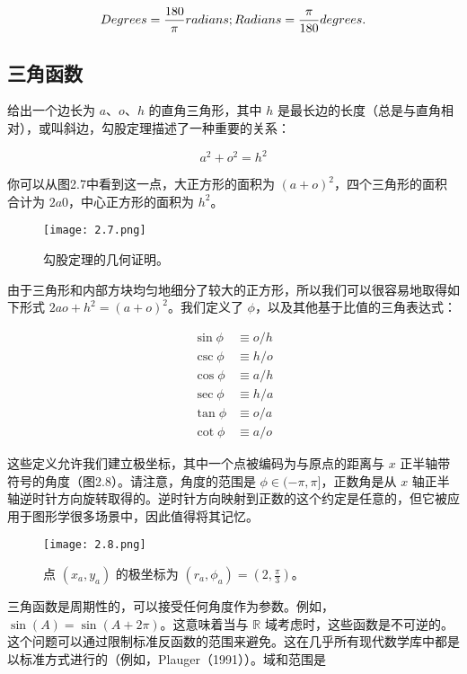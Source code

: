 \documentclass[lang=cn,12pt]{elegantbook}
\begin{document}
$$
Degrees =\frac{180}{\pi} radians; \\
Radians =\frac{\pi}{180} degrees.
$$

\subsection{三角函数}

给出一个边长为 $a$、$o$、$h$ 的直角三角形，其中 $h$ 是最长边的长度（总是与直角相对），或叫斜边，勾股定理描述了一种重要的关系：

$$
a^2+o^2=h^2
$$

你可以从图2.7中看到这一点，大正方形的面积为 $(a+o)^2$，四个三角形的面积合计为 $2a0$，中心正方形的面积为 $h^2$。


\begin{figure}[htbp]
\centering
\texttt{[image: 2.7.png]}
\caption{勾股定理的几何证明。}
\end{figure}

由于三角形和内部方块均匀地细分了较大的正方形，所以我们可以很容易地取得如下形式 $2ao+h^2=(a+o)^2$。我们定义了 $\phi$，以及其他基于比值的三角表达式：

$$
\begin{aligned}
\sin \phi & \equiv o / h \\
\csc \phi & \equiv h / o \\
\cos \phi & \equiv a / h \\
\sec \phi & \equiv h / a \\
\tan \phi & \equiv o / a \\
\cot \phi & \equiv a / o
\end{aligned}
$$

这些定义允许我们建立极坐标，其中一个点被编码为与原点的距离与 $x$ 正半轴带符号的角度（图2.8）。请注意，角度的范围是 $\phi\in(-\pi,\pi]$，正数角是从 $x$ 轴正半轴逆时针方向旋转取得的。逆时针方向映射到正数的这个约定是任意的，但它被应用于图形学很多场景中，因此值得将其记忆。

\begin{figure}[htbp]
\centering
\texttt{[image: 2.8.png]}
\caption{点 $(x_a,y_a)$ 的极坐标为 $(r_a,\phi_a)=(2,\frac{\pi}{3})$。}
\end{figure}

三角函数是周期性的，可以接受任何角度作为参数。例如，$\sin(A) = \sin(A + 2\pi)$。这意味着当与 $\mathbb{R}$ 域考虑时，这些函数是不可逆的。这个问题可以通过限制标准反函数的范围来避免。这在几乎所有现代数学库中都是以标准方式进行的（例如，Plauger（1991））。域和范围是
\end{document}
